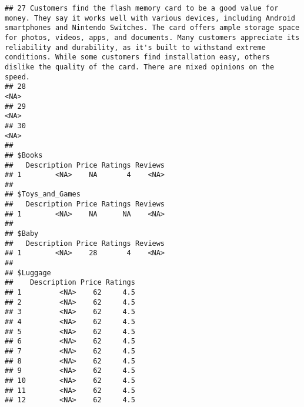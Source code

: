 \documentclass[
]{article}
\begin{document}
\begin{verbatim}
## 27 Customers find the flash memory card to be a good value for money. They say it works well with various devices, including Android smartphones and Nintendo Switches. The card offers ample storage space for photos, videos, apps, and documents. Many customers appreciate its reliability and durability, as it's built to withstand extreme conditions. While some customers find installation easy, others dislike the quality of the card. There are mixed opinions on the speed.
## 28                                                                                                                                                                                                                                                                                                                                                                                                                                                                                   <NA>
## 29                                                                                                                                                                                                                                                                                                                                                                                                                                                                                   <NA>
## 30                                                                                                                                                                                                                                                                                                                                                                                                                                                                                   <NA>
## 
## $Books
##   Description Price Ratings Reviews
## 1        <NA>    NA       4    <NA>
## 
## $Toys_and_Games
##   Description Price Ratings Reviews
## 1        <NA>    NA      NA    <NA>
## 
## $Baby
##   Description Price Ratings Reviews
## 1        <NA>    28       4    <NA>
## 
## $Luggage
##    Description Price Ratings
## 1         <NA>    62     4.5
## 2         <NA>    62     4.5
## 3         <NA>    62     4.5
## 4         <NA>    62     4.5
## 5         <NA>    62     4.5
## 6         <NA>    62     4.5
## 7         <NA>    62     4.5
## 8         <NA>    62     4.5
## 9         <NA>    62     4.5
## 10        <NA>    62     4.5
## 11        <NA>    62     4.5
## 12        <NA>    62     4.5

\end{verbatim}
\end{document}
